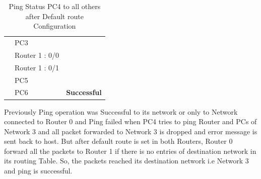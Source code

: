 \documentclass[a4paper,11pt]{article}
\begin{document}
\begin{enumerate}
\begin{itemize}
\begin{table}[H]
\begin{tabular}{| m{10em}| m{10em}| m{10em} |}
                            \hhline{|>{\arrayrulecolor[rgb]{0.141,0.525,1}}->{\arrayrulecolor{black}}->{\arrayrulecolor[rgb]{0.42,0.988,0.827}}->{\arrayrulecolor{black}}|}
                            {\cellcolor[rgb]{0.141,0.525,1}}                                & PC3                  & {\cellcolor[rgb]{0.42,0.988,0.827}}                                        \\
                            \hhline{|>{\arrayrulecolor[rgb]{0.141,0.525,1}}->{\arrayrulecolor{black}}->{\arrayrulecolor[rgb]{0.42,0.988,0.827}}->{\arrayrulecolor{black}}|}
                            {\cellcolor[rgb]{0.141,0.525,1}}                                & Router 1 : 0/0       & {\cellcolor[rgb]{0.42,0.988,0.827}}                                        \\
                            \hhline{|>{\arrayrulecolor[rgb]{0.141,0.525,1}}->{\arrayrulecolor{black}}->{\arrayrulecolor[rgb]{0.42,0.988,0.827}}->{\arrayrulecolor{black}}|}
                            {\cellcolor[rgb]{0.141,0.525,1}}                                & Router 1 : 0/1       & {\cellcolor[rgb]{0.42,0.988,0.827}}                                        \\
                            \hhline{|>{\arrayrulecolor[rgb]{0.141,0.525,1}}->{\arrayrulecolor{black}}->{\arrayrulecolor[rgb]{0.42,0.988,0.827}}->{\arrayrulecolor{black}}|}
                            {\cellcolor[rgb]{0.141,0.525,1}}                                & PC5                  & {\cellcolor[rgb]{0.42,0.988,0.827}}                                        \\
                            \hhline{|>{\arrayrulecolor[rgb]{0.141,0.525,1}}->{\arrayrulecolor{black}}->{\arrayrulecolor[rgb]{0.42,0.988,0.827}}->{\arrayrulecolor{black}}|}
                            \multirow{-10}{*}{{\cellcolor[rgb]{0.141,0.525,1}}\textbf{PC4}} & PC6                  & \multirow{-10}{*}{{\cellcolor[rgb]{0.42,0.988,0.827}} \textbf{Successful}} \\
                            \hline
                        \end{tabular}
                        \caption{ Ping Status PC4 to all others after Default route Configuration}
                    \end{table}

                    Previously Ping operation was Successful to its network or only to Network connected to  Router 0 and  Ping failed when PC4 tries to ping Router and PCs of Network 3 and all packet forwarded to Network 3 is dropped and error message is sent back to host. But after default route is set in both Routers, Router 0 forward all the packets to Router 1 if there is no entries of destination network in its routing Table. So, the packets reached its destination network i.e Network 3 and ping is successful.



\end{itemize}
\end{enumerate}
\end{document}

